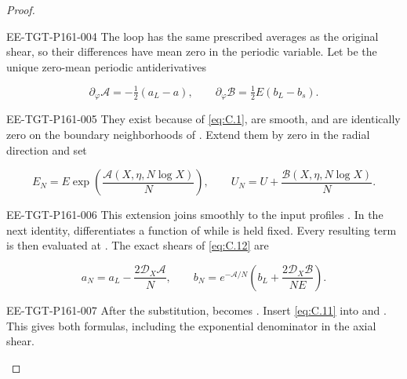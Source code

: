 \begin{proof}
\begin{EESegment}{EE-TGT-P161-004}
The loop has the same prescribed averages as the original shear, so their differences have mean zero in the periodic variable. Let  be the unique zero-mean periodic
antiderivatives
\end{EESegment}
\begin{equation}
 \partial_\varphi\mathscr A=-\tfrac12(a_L-a),
 \qquad
 \partial_\varphi\mathscr B=\tfrac12E(b_L-b_s).
\tag{C.11}\label{eq:C.11}
\end{equation}
\begin{EESegment}{EE-TGT-P161-005}
They exist because of \eqref{eq:C.1}, are smooth, and are identically zero on the boundary neighborhoods of
.
Extend them by zero in the radial direction and set
\end{EESegment}
\begin{equation}
 E_N=E\exp\!\left(\frac{\mathscr A(X,\eta,N\log X)}{N}\right),
 \qquad
 U_N=U+\frac{\mathscr B(X,\eta,N\log X)}{N}.
\tag{C.12}\label{eq:C.12}
\end{equation}
\begin{EESegment}{EE-TGT-P161-006}
This extension joins smoothly to the input profiles . In the next identity,
differentiates a function of  while  is held fixed. Every resulting term is then evaluated at
. The exact shears of \eqref{eq:C.12} are
\end{EESegment}
\begin{equation}
 a_N=a_L-\frac{2\mathcal D_X\mathscr A}{N},
 \qquad
 b_N=e^{-\mathscr A/N}\left(b_L+\frac{2\mathcal D_X\mathscr B}{NE}\right).
\tag{C.13}\label{eq:C.13}
\end{equation}
\begin{EESegment}{EE-TGT-P161-007}
After the substitution,  becomes
. Insert \eqref{eq:C.11} into
 and
. This gives both formulas, including the exponential denominator in the axial
shear.
\end{EESegment}


\end{proof}
